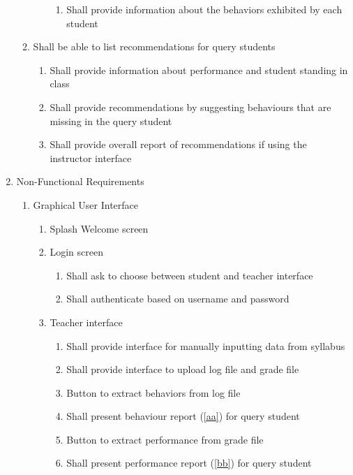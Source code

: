 \documentclass[12pt]{article}
\begin{document}
\begin{enumerate}[label = 3.\arabic*,itemsep=-1mm]
\begin{enumerate}[label* = .\arabic*, itemsep=-1mm]
\begin{enumerate}[label* = .\arabic*, itemsep=-1mm]
\begin{enumerate}[label* = .\arabic*, itemsep=-1mm]
					\item Shall provide information about the behaviors exhibited by each student
				\end{enumerate}
			\end{enumerate}
			\item Shall be able to list recommendations for query students
			\begin{enumerate}[label* = .\arabic*, itemsep=-1mm]
				\item Shall provide information about performance and student standing in class
				\item Shall provide recommendations by suggesting behaviours that are missing in the query student
				\item Shall provide overall report of recommendations if using the instructor interface
			\end{enumerate}
		\end{enumerate}
		\item Non-Functional Requirements
		\begin{enumerate}[label* = .\arabic*, itemsep=-1mm]
			\item Graphical User Interface	
			\begin{enumerate}[label* = .\arabic*, itemsep=-1mm]
				\item Splash Welcome screen
				\item Login screen
				\begin{enumerate}[label* = .\arabic*, itemsep=-1mm]
					\item Shall ask to choose between student and teacher interface
					\item Shall authenticate based on username and password
				\end{enumerate}
				\item Teacher interface
				\begin{enumerate}[label* = .\arabic*, itemsep=-1mm]
					\item Shall provide interface for manually inputting data from syllabus
					\item Shall provide interface to upload log file and grade file
					\item Button to extract behaviors from log file
					\item Shall present behaviour report (\ref{aa}) for query student
					\item Button to extract performance from grade file
					\item Shall present performance report (\ref{bb}) for query student

\end{enumerate}
\end{enumerate}
\end{enumerate}
\end{enumerate}
\end{document}

